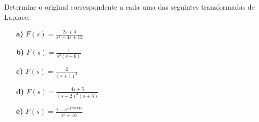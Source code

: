\linespread{1.5}

Determine o original correspondente a cada uma das seguintes transformadas de Laplace: 
\begin{itemize}
    \item[\textbf{a)}] $F(s) = \frac{2s+4}{s^2-4s+12}$
    \item[\textbf{b)}] $F(s) = \frac{1}{s^3(s+6)}$
    \item[\textbf{c)}]$F(s) = \frac{2}{(s+1)^3}$
    \item[\textbf{d)}]$F(s) = \frac{4s+5}{(s-2)^3(s+3)}$
    \item[\textbf{e)}]$F(s) = \frac{1-e^{-frac{\pi }{4}s}}{s^2+16}$
\end{itemize}